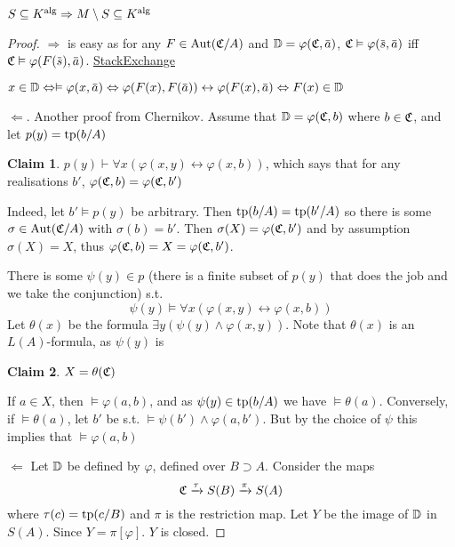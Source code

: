 \documentclass[11pt]{article}
\begin{document}
\(S\subseteq K^{\operatorname{\text{alg}}}\Rightarrow M\setminus S\subseteq K^{\operatorname{\text{alg}}}\)

\begin{proof}
\(\Rightarrow\) is easy as for any \(F\in\operatorname{\text{Aut}}(\mathfrak{C}/A)\) and \(\D=\varphi(\fC,\bara)\), \(\fC\vDash\varphi(\bars,\bara)\)
iff \(\fC\vDash\varphi(F(\bars),\bara)\). \href{https://math.stackexchange.com/questions/3361635/when-are-automorphism-invariant-subsets-definable}{StackExchange}

\(x\in\D\Leftrightarrow\vDash\varphi(x,\bara)\Leftrightarrow\varphi(F(x),F(\bara))\leftrightarrow\varphi(F(x),\bara)\Leftrightarrow F(x)\in\D\)

\(\Leftarrow\). Another proof from Chernikov. Assume that \(\mathbb{D}=\varphi(\mathfrak{C},b)\) where \(b\in\mathfrak{C}\), and
let \(p(y)=\operatorname{tp}(b/A)\)

\textbf{Claim 1}. \(p(y)\vdash\forall x(\varphi(x,y)\leftrightarrow\varphi(x,b))\), which says that for any realisations \(b'\), \(\varphi(\mathfrak{C},b)=\varphi(\mathfrak{C},b')\)

Indeed, let \(b'\vDash p(y)\) be arbitrary. Then \(\operatorname{tp}(b/A)=\operatorname{tp}(b'/A)\) so there is
some \(\sigma\in\operatorname{\text{Aut}}(\mathfrak{C}/A)\) with \(\sigma(b)=b'\). Then \(\sigma(X)=\varphi(\mathfrak{C},b')\) and by assumption \(\sigma(X)=X\),
thus \(\varphi(\mathfrak{C},b)=X=\varphi(\mathfrak{C},b')\).

There is some \(\psi(y)\in p\) (there is a finite subset of \(p(y)\) that does the job and we take
the conjunction) s.t.
\begin{equation*}
\psi(y)\vDash\forall x(\varphi(x,y)\leftrightarrow\varphi(x,b))
\end{equation*}
Let \(\theta(x)\) be the formula \(\exists y(\psi(y)\wedge\varphi(x,y))\). Note that \(\theta(x)\) is an \(L(A)\)-formula,
as \(\psi(y)\) is

\textbf{Claim 2}. \(X=\theta(\mathfrak{C})\)

If \(a\in X\), then \(\vDash\varphi(a,b)\), and as \(\psi(y)\in\operatorname{tp}(b/A)\) we have \(\vDash\theta(a)\). Conversely,
if \(\vDash\theta(a)\), let \(b'\) be s.t. \(\vDash\psi(b')\wedge\varphi(a,b')\). But by the choice of \(\psi\) this implies that \(\vDash\varphi(a,b)\)

\(\Leftarrow\) Let \(\mathbb{D}\) be defined by \(\varphi\), defined over \(B\supset A\). Consider the maps
\begin{equation*}
\mathfrak{C}\xrightarrow{\tau}S(B)\xrightarrow{\pi}S(A)
\end{equation*}
where \(\tau(c)=\operatorname{tp}(c/B)\) and \(\pi\) is the restriction map. Let \(Y\) be the image of \(\mathbb{D}\)
in \(S(A)\). Since \(Y=\pi[\varphi]\). \(Y\) is closed.



\end{proof}
\end{document}
